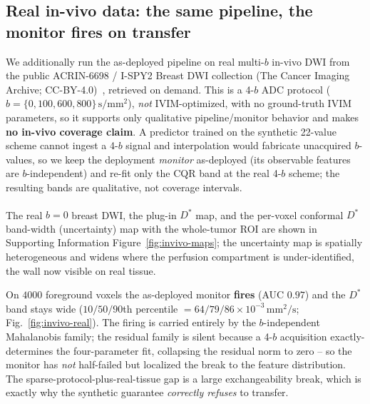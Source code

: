 \documentclass[11pt]{article}
\newcommand{\Dstar}{D^{*}}
\newcommand{\unit}[1]{\,\mathrm{#1}}
\begin{document}
\subsection{Real in-vivo data: the same pipeline, the monitor fires on transfer}
\label{sec:invivo-real}
We additionally run the as-deployed pipeline on real multi-$b$ in-vivo DWI from the
public ACRIN-6698 / I-SPY2 Breast DWI collection (The Cancer Imaging Archive;
CC-BY-4.0)~\cite{acrin6698,clark2013tcia}, retrieved on demand. This is a 4-$b$ ADC
protocol ($b=\{0,100,600,800\}\unit{s/mm^2}$), \emph{not} IVIM-optimized, with no
ground-truth IVIM parameters, so it supports only qualitative pipeline/monitor
behavior and makes \textbf{no in-vivo coverage claim}. A predictor trained on the
synthetic 22-value scheme cannot ingest a 4-$b$ signal and interpolation would
fabricate unacquired $b$-values, so we keep the deployment \emph{monitor} as-deployed
(its observable features are $b$-independent) and re-fit only the CQR band at the real
4-$b$ scheme; the resulting bands are qualitative, not coverage intervals.

The real $b{=}0$ breast DWI, the plug-in $\hat{\Dstar}$ map, and the per-voxel
conformal $\Dstar$ band-width (uncertainty) map with the whole-tumor ROI are shown in
Supporting Information Figure~\ref{fig:invivo-maps}; the uncertainty map is spatially
heterogeneous and widens where the perfusion compartment is under-identified, the wall
now visible on real tissue.

On $4000$ foreground voxels the as-deployed monitor \textbf{fires} (AUC $0.97$) and
the $\Dstar$ band stays wide ($10/50/90$th percentile
$=64/79/86\times10^{-3}\unit{mm^2/s}$; Fig.~\ref{fig:invivo-real}). The firing is
carried entirely by the $b$-independent Mahalanobis family; the residual family is
silent because a 4-$b$ acquisition exactly-determines the four-parameter fit,
collapsing the residual norm to zero -- so the monitor has \emph{not} half-failed but
localized the break to the feature distribution. The sparse-protocol-plus-real-tissue
gap is a large exchangeability break, which is exactly why the synthetic guarantee
\emph{correctly refuses} to transfer.
\end{document}
